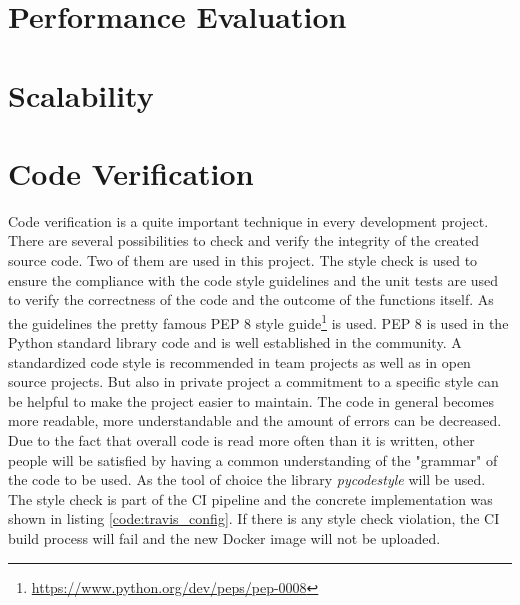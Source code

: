 \section{Performance Evaluation}
\label{section:performance-evaluation}
\doit

\section{Scalability}
\label{section:scalability}
\doit

\section{Code Verification}
\label{section:code-verification}
Code verification is a quite important technique in every development project.
There are several possibilities to check and verify the integrity of the created source code.
Two of them are used in this project.
The style check is used to ensure the compliance with the code style guidelines and the unit tests are used to verify the correctness of the code and the outcome of the functions itself.
As the guidelines the pretty famous \ac{PEP} 8 style guide\footnote{\url{https://www.python.org/dev/peps/pep-0008}} is used.
\ac{PEP} 8 is used in the Python standard library code and is well established in the community.
A standardized code style is recommended in team projects as well as in open source projects.
But also in private project a commitment to a specific style can be helpful to make the project easier to maintain.
The code in general becomes more readable, more understandable and the amount of errors can be decreased.
Due to the fact that overall code is read more often than it is written, other people will be satisfied by having a common understanding of the "grammar" of the code to be used.
As the tool of choice the library \textit{pycodestyle} will be used.
The style check is part of the \ac{CI} pipeline and the concrete implementation was shown in listing \ref{code:travis_config}.
If there is any style check violation, the \ac{CI} build process will fail and the new Docker image will not be uploaded.

